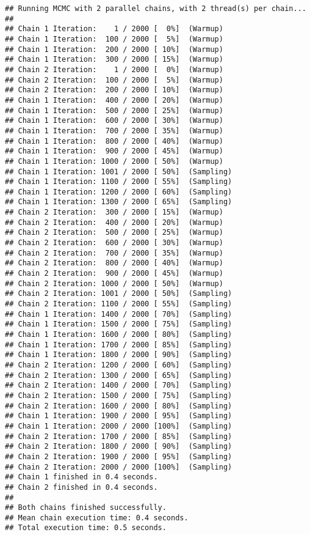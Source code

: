 \documentclass[
]{article}
\begin{document}
\begin{verbatim}
## Running MCMC with 2 parallel chains, with 2 thread(s) per chain...
## 
## Chain 1 Iteration:    1 / 2000 [  0%]  (Warmup) 
## Chain 1 Iteration:  100 / 2000 [  5%]  (Warmup) 
## Chain 1 Iteration:  200 / 2000 [ 10%]  (Warmup) 
## Chain 1 Iteration:  300 / 2000 [ 15%]  (Warmup) 
## Chain 2 Iteration:    1 / 2000 [  0%]  (Warmup) 
## Chain 2 Iteration:  100 / 2000 [  5%]  (Warmup) 
## Chain 2 Iteration:  200 / 2000 [ 10%]  (Warmup) 
## Chain 1 Iteration:  400 / 2000 [ 20%]  (Warmup) 
## Chain 1 Iteration:  500 / 2000 [ 25%]  (Warmup) 
## Chain 1 Iteration:  600 / 2000 [ 30%]  (Warmup) 
## Chain 1 Iteration:  700 / 2000 [ 35%]  (Warmup) 
## Chain 1 Iteration:  800 / 2000 [ 40%]  (Warmup) 
## Chain 1 Iteration:  900 / 2000 [ 45%]  (Warmup) 
## Chain 1 Iteration: 1000 / 2000 [ 50%]  (Warmup) 
## Chain 1 Iteration: 1001 / 2000 [ 50%]  (Sampling) 
## Chain 1 Iteration: 1100 / 2000 [ 55%]  (Sampling) 
## Chain 1 Iteration: 1200 / 2000 [ 60%]  (Sampling) 
## Chain 1 Iteration: 1300 / 2000 [ 65%]  (Sampling) 
## Chain 2 Iteration:  300 / 2000 [ 15%]  (Warmup) 
## Chain 2 Iteration:  400 / 2000 [ 20%]  (Warmup) 
## Chain 2 Iteration:  500 / 2000 [ 25%]  (Warmup) 
## Chain 2 Iteration:  600 / 2000 [ 30%]  (Warmup) 
## Chain 2 Iteration:  700 / 2000 [ 35%]  (Warmup) 
## Chain 2 Iteration:  800 / 2000 [ 40%]  (Warmup) 
## Chain 2 Iteration:  900 / 2000 [ 45%]  (Warmup) 
## Chain 2 Iteration: 1000 / 2000 [ 50%]  (Warmup) 
## Chain 2 Iteration: 1001 / 2000 [ 50%]  (Sampling) 
## Chain 2 Iteration: 1100 / 2000 [ 55%]  (Sampling) 
## Chain 1 Iteration: 1400 / 2000 [ 70%]  (Sampling) 
## Chain 1 Iteration: 1500 / 2000 [ 75%]  (Sampling) 
## Chain 1 Iteration: 1600 / 2000 [ 80%]  (Sampling) 
## Chain 1 Iteration: 1700 / 2000 [ 85%]  (Sampling) 
## Chain 1 Iteration: 1800 / 2000 [ 90%]  (Sampling) 
## Chain 2 Iteration: 1200 / 2000 [ 60%]  (Sampling) 
## Chain 2 Iteration: 1300 / 2000 [ 65%]  (Sampling) 
## Chain 2 Iteration: 1400 / 2000 [ 70%]  (Sampling) 
## Chain 2 Iteration: 1500 / 2000 [ 75%]  (Sampling) 
## Chain 2 Iteration: 1600 / 2000 [ 80%]  (Sampling) 
## Chain 1 Iteration: 1900 / 2000 [ 95%]  (Sampling) 
## Chain 1 Iteration: 2000 / 2000 [100%]  (Sampling) 
## Chain 2 Iteration: 1700 / 2000 [ 85%]  (Sampling) 
## Chain 2 Iteration: 1800 / 2000 [ 90%]  (Sampling) 
## Chain 2 Iteration: 1900 / 2000 [ 95%]  (Sampling) 
## Chain 2 Iteration: 2000 / 2000 [100%]  (Sampling) 
## Chain 1 finished in 0.4 seconds.
## Chain 2 finished in 0.4 seconds.
## 
## Both chains finished successfully.
## Mean chain execution time: 0.4 seconds.
## Total execution time: 0.5 seconds.
\end{verbatim}
\end{document}
